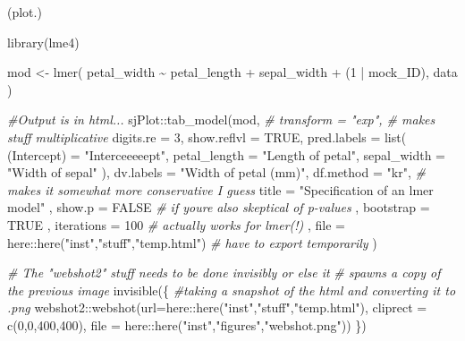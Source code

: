 \documentclass[
]{article}
\newenvironment{Shaded}{\begin{snugshade}}{\end{snugshade}}
\newcommand{\AttributeTok}[1]{\textcolor[rgb]{0.77,0.63,0.00}{#1}}
\newcommand{\CommentTok}[1]{\textcolor[rgb]{0.56,0.35,0.01}{\textit{#1}}}
\newcommand{\ConstantTok}[1]{\textcolor[rgb]{0.00,0.00,0.00}{#1}}
\newcommand{\DecValTok}[1]{\textcolor[rgb]{0.00,0.00,0.81}{#1}}
\newcommand{\FunctionTok}[1]{\textcolor[rgb]{0.00,0.00,0.00}{#1}}
\newcommand{\NormalTok}[1]{#1}
\newcommand{\OtherTok}[1]{\textcolor[rgb]{0.56,0.35,0.01}{#1}}
\newcommand{\SpecialCharTok}[1]{\textcolor[rgb]{0.00,0.00,0.00}{#1}}
\newcommand{\StringTok}[1]{\textcolor[rgb]{0.31,0.60,0.02}{#1}}
\begin{document}
\begin{Shaded}
\begin{Highlighting}[]
\NormalTok{(plot.)}


\FunctionTok{library}\NormalTok{(lme4)}

\NormalTok{mod }\OtherTok{\textless{}{-}} \FunctionTok{lmer}\NormalTok{(}
\NormalTok{  petal\_width }\SpecialCharTok{\textasciitilde{}}
\NormalTok{    petal\_length }\SpecialCharTok{+}
\NormalTok{    sepal\_width }\SpecialCharTok{+}
\NormalTok{    (}\DecValTok{1} \SpecialCharTok{|}\NormalTok{ mock\_ID),}
\NormalTok{  data}
\NormalTok{)}


\CommentTok{\#Output is in html...}
\NormalTok{sjPlot}\SpecialCharTok{::}\FunctionTok{tab\_model}\NormalTok{(mod,}
    \CommentTok{\# transform = "exp", \# makes stuff multiplicative}
    \AttributeTok{digits.re =} \DecValTok{3}\NormalTok{,}
    \AttributeTok{show.reflvl =} \ConstantTok{TRUE}\NormalTok{,}
    \AttributeTok{pred.labels =} \FunctionTok{list}\NormalTok{(}
      \StringTok{\textasciigrave{}}\AttributeTok{(Intercept)}\StringTok{\textasciigrave{}} \OtherTok{=} \StringTok{"Interceeeeept"}\NormalTok{,}
      \AttributeTok{petal\_length  =} \StringTok{"Length of petal"}\NormalTok{,}
      \AttributeTok{sepal\_width   =} \StringTok{"Width of sepal"}
\NormalTok{    ),}
    \AttributeTok{dv.labels =} \StringTok{"Width of petal (mm)"}\NormalTok{,}
    \AttributeTok{df.method =} \StringTok{"kr"}\NormalTok{, }\CommentTok{\# makes it somewhat more conservative I guess}
    \AttributeTok{title =} \StringTok{"Specification of an lmer model"}
\NormalTok{    , }\AttributeTok{show.p =} \ConstantTok{FALSE} \CommentTok{\# if you\textquotesingle{}re also skeptical of p{-}values}
\NormalTok{    , }\AttributeTok{bootstrap =} \ConstantTok{TRUE}
\NormalTok{    , }\AttributeTok{iterations =} \DecValTok{100} \CommentTok{\# actually works for lmer(!)}
\NormalTok{    , }\AttributeTok{file =}\NormalTok{ here}\SpecialCharTok{::}\FunctionTok{here}\NormalTok{(}\StringTok{"inst"}\NormalTok{,}\StringTok{"stuff"}\NormalTok{,}\StringTok{"temp.html"}\NormalTok{) }\CommentTok{\# have to export temporarily}
\NormalTok{  )}


  \CommentTok{\# The "webshot2" stuff needs to be done \textquotesingle{}invisibly\textquotesingle{} or else it }
  \CommentTok{\# spawns a copy of the previous image  }
\FunctionTok{invisible}\NormalTok{(\{}
  \CommentTok{\#taking a \textquotesingle{}snapshot\textquotesingle{} of the html and converting it to .png}
\NormalTok{  webshot2}\SpecialCharTok{::}\FunctionTok{webshot}\NormalTok{(}\AttributeTok{url=}\NormalTok{here}\SpecialCharTok{::}\FunctionTok{here}\NormalTok{(}\StringTok{"inst"}\NormalTok{,}\StringTok{"stuff"}\NormalTok{,}\StringTok{"temp.html"}\NormalTok{), }
                    \AttributeTok{cliprect =} \FunctionTok{c}\NormalTok{(}\DecValTok{0}\NormalTok{,}\DecValTok{0}\NormalTok{,}\DecValTok{400}\NormalTok{,}\DecValTok{400}\NormalTok{),}
                    \AttributeTok{file =}\NormalTok{ here}\SpecialCharTok{::}\FunctionTok{here}\NormalTok{(}\StringTok{"inst"}\NormalTok{,}\StringTok{"figures"}\NormalTok{,}\StringTok{"webshot.png"}\NormalTok{))}
\NormalTok{\})}




\end{Highlighting}
\end{Shaded}
\end{document}

